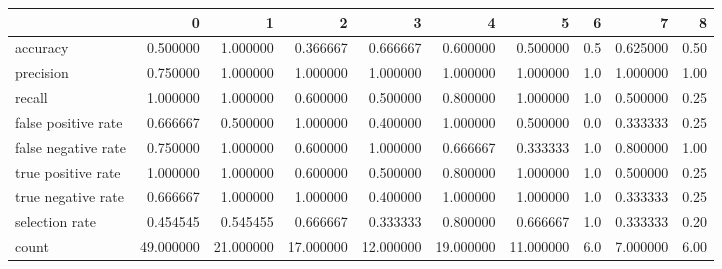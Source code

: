 \begin{tabular}{lrrrrrrrrr}
\toprule
{} &          0 &          1 &          2 &          3 &          4 &          5 &    6 &         7 &     8 \\
\midrule
accuracy            &   0.500000 &   1.000000 &   0.366667 &   0.666667 &   0.600000 &   0.500000 &  0.5 &  0.625000 &  0.50 \\
precision           &   0.750000 &   1.000000 &   1.000000 &   1.000000 &   1.000000 &   1.000000 &  1.0 &  1.000000 &  1.00 \\
recall              &   1.000000 &   1.000000 &   0.600000 &   0.500000 &   0.800000 &   1.000000 &  1.0 &  0.500000 &  0.25 \\
false positive rate &   0.666667 &   0.500000 &   1.000000 &   0.400000 &   1.000000 &   0.500000 &  0.0 &  0.333333 &  0.25 \\
false negative rate &   0.750000 &   1.000000 &   0.600000 &   1.000000 &   0.666667 &   0.333333 &  1.0 &  0.800000 &  1.00 \\
true positive rate  &   1.000000 &   1.000000 &   0.600000 &   0.500000 &   0.800000 &   1.000000 &  1.0 &  0.500000 &  0.25 \\
true negative rate  &   0.666667 &   1.000000 &   1.000000 &   0.400000 &   1.000000 &   1.000000 &  1.0 &  0.333333 &  0.25 \\
selection rate      &   0.454545 &   0.545455 &   0.666667 &   0.333333 &   0.800000 &   0.666667 &  1.0 &  0.333333 &  0.20 \\
count               &  49.000000 &  21.000000 &  17.000000 &  12.000000 &  19.000000 &  11.000000 &  6.0 &  7.000000 &  6.00 \\
\bottomrule
\end{tabular}
